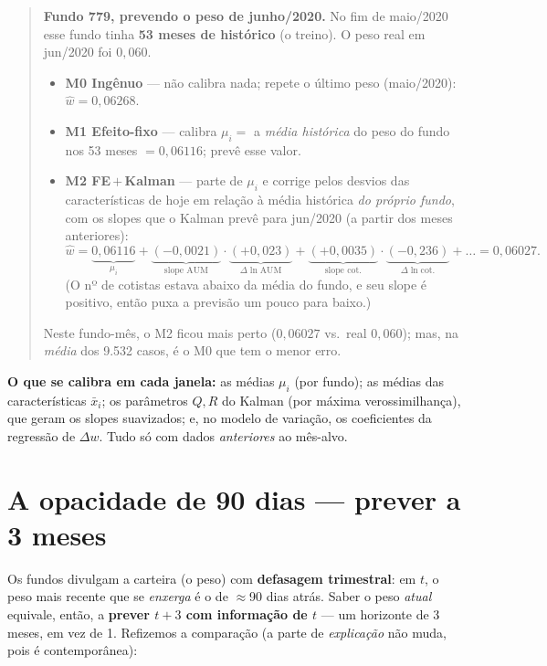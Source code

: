\documentclass[11pt]{article}
\begin{document}
\begin{quote}
\textbf{Fundo 779, prevendo o peso de junho/2020.} No fim de maio/2020 esse fundo tinha
\textbf{53 meses de histórico} (o treino). O peso real em jun/2020 foi $0{,}060$.
\begin{itemize}[noitemsep]
\item \textbf{M0 Ingênuo} --- não calibra nada; repete o último peso (maio/2020):
$\widehat{w}=0{,}06268$.
\item \textbf{M1 Efeito-fixo} --- calibra $\mu_i=$ a \emph{média histórica} do peso do
fundo nos 53 meses $=0{,}06116$; prevê esse valor.
\item \textbf{M2 FE\,$+$\,Kalman} --- parte de $\mu_i$ e corrige pelos desvios das
características de hoje em relação à média histórica \emph{do próprio fundo}, com os
slopes que o Kalman prevê para jun/2020 (a partir dos meses anteriores):
\[
\widehat{w}=\underbrace{0{,}06116}_{\mu_i}
+\underbrace{(-0{,}0021)}_{\text{slope AUM}}\cdot\underbrace{(+0{,}023)}_{\Delta\ln\text{AUM}}
+\underbrace{(+0{,}0035)}_{\text{slope cot.}}\cdot\underbrace{(-0{,}236)}_{\Delta\ln\text{cot.}}
+\dots=0{,}06027.
\]
(O nº de cotistas estava abaixo da média do fundo, e seu slope é positivo, então puxa a
previsão um pouco para baixo.)
\end{itemize}
Neste fundo-mês, o M2 ficou mais perto ($0{,}06027$ vs.\ real $0{,}060$); mas, na
\emph{média} dos 9.532 casos, é o M0 que tem o menor erro.
\end{quote}

\noindent\textbf{O que se calibra em cada janela:} as médias $\mu_i$ (por fundo); as
médias das características $\bar x_i$; os parâmetros $Q,R$ do Kalman (por máxima
verossimilhança), que geram os slopes suavizados; e, no modelo de variação, os
coeficientes da regressão de $\Delta w$. Tudo só com dados \emph{anteriores} ao
mês-alvo.

\section{A opacidade de 90 dias --- prever a 3 meses}

Os fundos divulgam a carteira (o peso) com \textbf{defasagem trimestral}: em $t$, o peso
mais recente que se \emph{enxerga} é o de $\approx$90 dias atrás. Saber o peso
\emph{atual} equivale, então, a \textbf{prever $t+3$ com informação de $t$} --- um
horizonte de 3 meses, em vez de 1. Refizemos a comparação (a parte de \emph{explicação}
não muda, pois é contemporânea):
\end{document}
